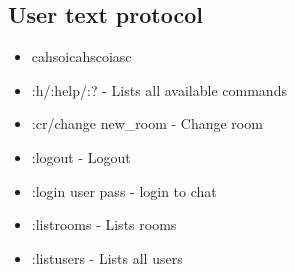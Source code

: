 \subsection{User text protocol}

\begin{itemize}
\item cahsoicahscoiasc
\item :h/:help/:? - Lists all available commands\\
\item :cr/change new\_room - Change room\\
\item :logout - Logout \\
\item :login user pass - login to chat\\
\item :listrooms - Lists rooms\\
\item :listusers - Lists all users\\
\end{itemize}